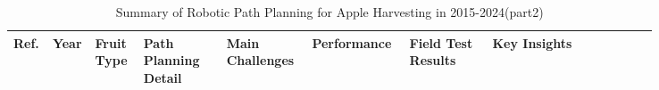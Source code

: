 \documentclass[a4paper,fleqn]{cas-dc}
\begin{document}
\begin{table} 
	\centering
	\footnotesize 
	\addtocounter{table}{-1} 
	\caption{Summary of Robotic Path Planning for Apple Harvesting in 2015-2024(part2)} 
	\begin{tabular}{p{0.025\linewidth} p{0.025\linewidth} p{0.07\linewidth} p{0.12\linewidth} p{0.12\linewidth} p{0.12\linewidth} p{0.12\linewidth} p{0.24\linewidth}}
\toprule
\textbf{Ref.} & \textbf{Year} & \textbf{Fruit Type} & \textbf{Path Planning Detail} & \textbf{Main Challenges} & \textbf{Performance} & \textbf{Field Test Results} & \textbf{Key Insights} \\ \midrule


\end{tabular}
\end{table}
\end{document}
